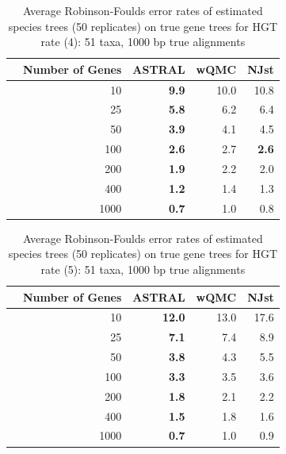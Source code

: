 \begin{table}[h!]
\begin{tabular}{rrrrr}
 & Number of Genes & ASTRAL & wQMC  & NJst\\
\hline
 & 10 & \textbf{9.9} & 10.0   & 10.8\\
 & 25 & \textbf{5.8} & 6.2  & 6.4\\
 & 50 & \textbf{3.9} & 4.1   & 4.5\\
 & 100 & \textbf{2.6} & 2.7   & \textbf{2.6} \\
 & 200 & \textbf{1.9} & 2.2   & 2.0\\
 & 400 & \textbf{1.2} & 1.4   & 1.3\\
 & 1000 & \textbf{0.7} & 1.0   & 0.8\\
\end{tabular}
\caption[Error rates of estimated species trees (50 replicates)  on true gene trees for HGT rate 4]{Average Robinson-Foulds error rates of estimated species trees (50 replicates)  on true gene trees for HGT rate (4): 51 taxa, 1000 bp true alignments}

\label{hgt::table10}
\end{table}

\begin{table}[h!]
\begin{tabular}{rrrrr}
 & Number of Genes & ASTRAL & wQMC  & NJst\\
\hline
 & 10 & \textbf{12.0} & 13.0   & 17.6\\
 & 25 & \textbf{7.1} & 7.4  & 8.9\\
 & 50 & \textbf{3.8} & 4.3   & 5.5\\
 & 100 & \textbf{3.3} & 3.5   & 3.6\\
 & 200 & \textbf{1.8} & 2.1   & 2.2\\
 & 400 & \textbf{1.5} & 1.8  & 1.6\\
 & 1000 & \textbf{0.7}& 1.0   & 0.9\\
\end{tabular}
\caption[Error rates of estimated species trees (50 replicates)  on true gene trees for HGT rate 5]{Average Robinson-Foulds error rates of estimated species trees (50 replicates) 
on true gene trees for HGT rate (5): 51 taxa, 1000 bp true alignments}

\label{hgt::table11}
\end{table}



